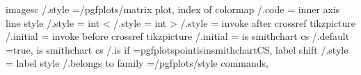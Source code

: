 {{{{{{{{{{{{{{{{{{{imagesc                                      /.style                                                                                   ={/pgfplots/matrix plot},%
index of colormap                            /.code                                                                                    ={%
inner axis line style                        /.style                                                                                   ={                                                                                                                  
int <                                        /.style                                                                                   ={%
int >                                        /.style                                                                                   ={%
invoke after crossref tikzpicture            /.initial                                                                                 ={%
invoke before crossref tikzpicture           /.initial                                                                                 ={%
is smithchart cs                             /.default                                                                                 =true,                                                                                                              
is smithchart cs                             /.is if                                                                                   =pgfplotspointisinsmithchartCS,                                                                                     
label shift                                  /.style                                                                                   ={%
label style                                  /.belongs to family                                                                       =/pgfplots/style commands,                                                                                          
}}}}}}}}}}}}}}}}}}}}}}}}}}
